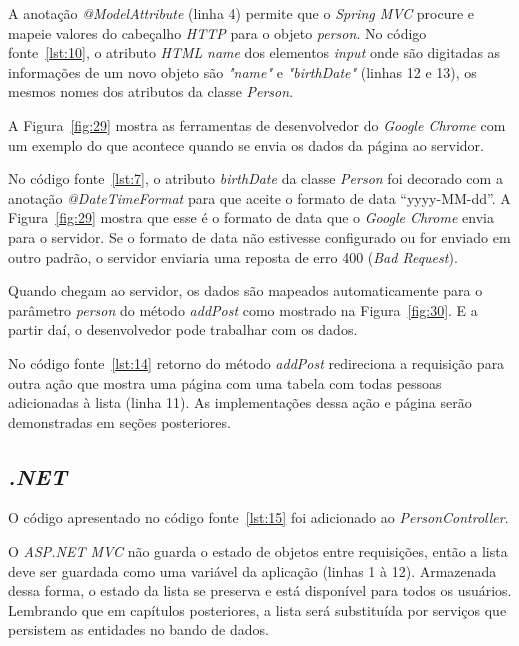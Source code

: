 A anotação \textit{@ModelAttribute} (linha 4) permite que o \textit{Spring MVC} procure e mapeie valores do cabeçalho \textit{HTTP} para o objeto \textit{person}. No código fonte~\ref{lst:10}, o atributo \textit{HTML} \textit{name} dos elementos \textit{input} onde são digitadas as informações de um novo objeto são \textit{"name"} e \textit{"birthDate"} (linhas 12 e 13), os mesmos nomes dos atributos da classe \textit{Person}.

A Figura~\ref{fig:29} mostra as ferramentas de desenvolvedor do \textit{Google Chrome} com um exemplo do que acontece quando se envia os dados da página ao servidor.


No código fonte~\ref{lst:7}, o atributo \textit{birthDate} da classe \textit{Person} foi decorado com a anotação \textit{@DateTimeFormat} para que aceite o formato de data “yyyy-MM-dd”. A Figura~\ref{fig:29} mostra que esse é o formato de data que o \textit{Google Chrome} envia para o servidor. Se o formato de data não estivesse configurado ou for enviado em outro padrão, o servidor enviaria uma reposta de erro 400 (\textit{Bad Request}).

Quando chegam ao servidor, os dados são mapeados automaticamente para o parâmetro \textit{person} do método \textit{addPost} como mostrado na Figura~\ref{fig:30}. E a partir daí, o desenvolvedor pode trabalhar com os dados.


No código fonte~\ref{lst:14} retorno do método \textit{addPost} redireciona a requisição para outra ação que mostra uma página com uma tabela com todas pessoas adicionadas à lista (linha 11). As implementações dessa ação e página serão demonstradas em seções posteriores.

\subsection{\textit{.NET}}

O código apresentado no código fonte~\ref{lst:15} foi adicionado ao \textit{PersonController}.


O \textit{ASP.NET MVC} não guarda o estado de objetos entre requisições, então a lista deve ser guardada como uma variável da aplicação (linhas 1 à 12). Armazenada dessa forma, o estado da lista se preserva e está disponível para todos os usuários. Lembrando que em capítulos posteriores, a lista será substituída por serviços que persistem as entidades no bando de dados.

